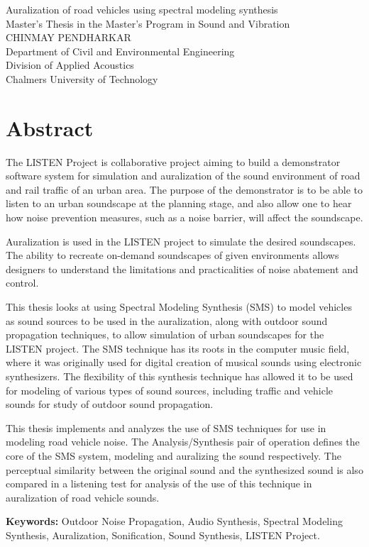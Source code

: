 \noindent
Auralization of road vehicles using spectral modeling synthesis\\
Master's Thesis in the \textsf{Master's Program in Sound and Vibration}\\
CHINMAY PENDHARKAR\\
Department of Civil and Environmental Engineering\\
Division of Applied Acoustics\\
Chalmers University of Technology\\

\vspace{1.5cm}
\section*{Abstract}

The LISTEN Project is collaborative project aiming to build a demonstrator software system for simulation and auralization of the sound environment of road and rail traffic of an urban area. The purpose of the demonstrator is to be able to listen to an urban soundscape at the planning stage, and also allow one to hear how noise prevention measures, such as a noise barrier, will affect the soundscape.

Auralization is used in the LISTEN project to simulate the desired soundscapes. The ability to recreate on-demand soundscapes of given environments allows designers to understand the limitations and practicalities of noise abatement and control.

This thesis looks at using Spectral Modeling Synthesis (SMS) to model vehicles as sound sources to be used in the auralization, along with outdoor sound propagation techniques, to allow simulation of urban soundscapes for the LISTEN project. The SMS technique has its roots in the computer music field, where it was originally used for digital creation of musical sounds using electronic synthesizers. The flexibility of this synthesis technique has allowed it to be used for modeling of various types of sound sources, including traffic and vehicle sounds for study of outdoor sound propagation.

This thesis implements and analyzes the use of SMS techniques for use in modeling road vehicle noise. The Analysis/Synthesis pair of operation defines the core of the SMS system, modeling and auralizing the sound respectively. The perceptual similarity between the original sound and the synthesized sound is also compared in a listening test for analysis of the use of this technique in  auralization of road vehicle sounds.

\vspace{\baselineskip}
\textbf{Keywords:} Outdoor Noise Propagation, Audio Synthesis, Spectral Modeling Synthesis, Auralization, Sonification, Sound Synthesis, LISTEN Project.



